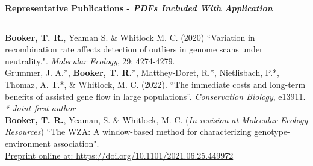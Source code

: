 \documentclass[11pt]{article}
\newcommand{\makeheadingGeneric}[2][]%
        {\hspace*{-\marginparsep minus \marginparwidth}%
         \begin{minipage}[t]{\textwidth+\marginparwidth+\marginparsep}%
             {\large \bfseries #2 \hfill #1}\\[-0.15\baselineskip]%
                 \rule{\columnwidth}{1pt}%
         \end{minipage}}
\begin{document}
\newpage
	

\makeheadingGeneric{Representative Publications - \textit{PDFs Included With Application}}

\vspace{10pt}

 {\bf Booker, T. R.}, Yeaman S. \& Whitlock M. C. (2020) ``Variation in recombination rate affects detection of outliers in genome scans under neutrality.". \emph{Molecular Ecology}, 29: 4274-4279.\\ 
 
Grummer, J. A.*, \textbf{Booker, T. R.}*, Matthey-Doret, R.*, Nietlisbach, P.*, Thomaz, A. T.*, \& Whitlock, M. C. (2022). ``The immediate costs and long-term benefits of assisted gene flow in large populations''. \textit{Conservation Biology}, e13911.\\
     \emph{* Joint first author}\\
     
{\bf Booker, T. R.}, Yeaman, S. \& Whitlock, M. C.   (\textit{In revision at Molecular Ecology Resources}) ``The WZA: A window-based method for characterizing genotype-environment association".  \\\href{https://www.biorxiv.org/content/10.1101/2021.06.25.449972v1}{Preprint online at: https://doi.org/10.1101/2021.06.25.449972}\\
    




\end{document}
